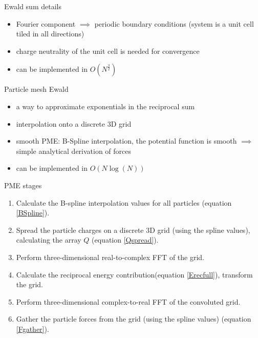 \documentclass[11pt]{beamer}
\begin{document}
\begin{frame}{Ewald sum details}
\begin{itemize}
\item Fourier component $\implies$ periodic boundary conditions (system is a unit cell tiled in all directions)
\item charge neutrality of the unit cell is needed for convergence
\item can be implemented in $O(N^\frac{3}{2})$

\end{itemize}
\end{frame}

\begin{frame}{Particle mesh Ewald}
\begin{itemize}
\item a way to approximate exponentials in the reciprocal sum 
\item interpolation onto a discrete 3D grid
\item smooth PME: B-Spline interpolation, the potential function is smooth $\implies$ simple analytical derivation of forces
\item can be implemented in $O(N \log(N))$
\end{itemize}
\end{frame}

\begin{frame}{PME stages}
\begin{enumerate}
\item Calculate the B-spline interpolation values for all particles (equation \eqref{BSpline}).
\item Spread the particle charges on a discrete 3D grid (using the spline values), calculating the array $Q$ (equation \eqref{Qspread}).
\item Perform three-dimensional real-to-complex FFT of the grid.
\item Calculate the reciprocal energy contribution(equation \eqref{Erecfull}), transform the grid.
\item Perform three-dimensional complex-to-real FFT of the convoluted grid.
\item Gather the particle forces from the grid (using the spline values) (equation \eqref{Fgather}).
\end{enumerate}
\end{frame}
\end{document}
